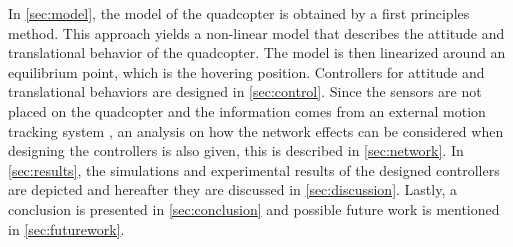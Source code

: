 In \autoref{sec:model}, the model of the quadcopter is obtained by a first principles method. This approach yields a non-linear model that describes the attitude and translational behavior of the quadcopter. The model is then linearized around an equilibrium point, which is the hovering position. 
%
Controllers for attitude and translational behaviors are designed in \autoref{sec:control}.%
%
Since the sensors are not placed on the quadcopter and the information comes from an external motion tracking system \cite{vicon}, an analysis on how the network effects can be considered when designing the controllers is also given, this is described in \autoref{sec:network}.
%
In \autoref{sec:results}, the simulations and experimental results of the designed controllers are depicted and hereafter they are discussed in \autoref{sec:discussion}. Lastly, a conclusion is presented in \autoref{sec:conclusion} and possible future work is mentioned in \autoref{sec:futurework}. 